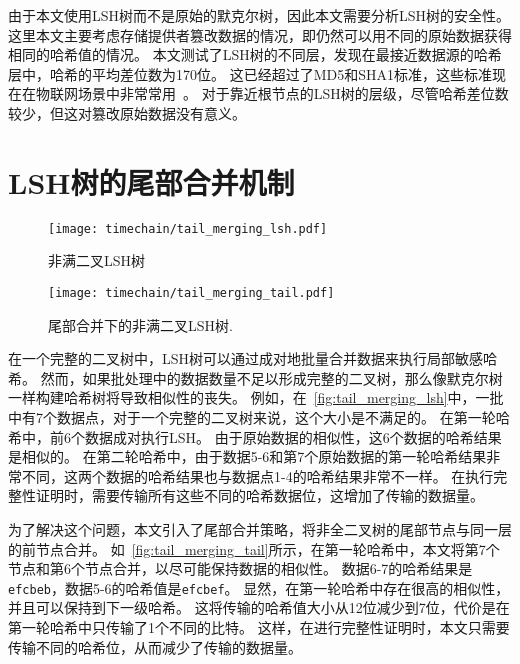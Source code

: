 由于本文使用LSH树而不是原始的默克尔树，因此本文需要分析LSH树的安全性。
这里本文主要考虑存储提供者篡改数据的情况，即仍然可以用不同的原始数据获得相同的哈希值的情况。
本文测试了LSH树的不同层，发现在最接近数据源的哈希层中，哈希的平均差位数为170位。
这已经超过了MD5和SHA1标准，这些标准现在在物联网场景中非常常用~\cite{chi2017hashing,landge2018secured}。
对于靠近根节点的LSH树的层级，尽管哈希差位数较少，但这对篡改原始数据没有意义。

\section{LSH树的尾部合并机制}

\begin{figure}[t]
    \centering
	\begin{minipage}{0.6\linewidth}
        \centering
        \texttt{[image: timechain/tail\_merging\_lsh.pdf]}
        \caption{非满二叉LSH树}
        \label{fig:tail_merging_lsh}
	\end{minipage}
\end{figure}

\begin{figure}[t]
    \centering
	\begin{minipage}{0.6\linewidth}
        \centering
        \texttt{[image: timechain/tail\_merging\_tail.pdf]}
	\end{minipage}
	\caption{尾部合并下的非满二叉LSH树.}
	\label{fig:tail_merging_tail}
\end{figure}

在一个完整的二叉树中，LSH树可以通过成对地批量合并数据来执行局部敏感哈希。
然而，如果批处理中的数据数量不足以形成完整的二叉树，那么像默克尔树一样构建哈希树将导致相似性的丧失。
例如，在~\autoref{fig:tail_merging_lsh}中，一批中有7个数据点，对于一个完整的二叉树来说，这个大小是不满足的。
在第一轮哈希中，前6个数据成对执行LSH。
由于原始数据的相似性，这6个数据的哈希结果是相似的。
在第二轮哈希中，由于数据5-6和第7个原始数据的第一轮哈希结果非常不同，这两个数据的哈希结果也与数据点1-4的哈希结果非常不一样。
在执行完整性证明时，需要传输所有这些不同的哈希数据位，这增加了传输的数据量。

为了解决这个问题，本文引入了尾部合并策略，将非全二叉树的尾部节点与同一层的前节点合并。
如~\autoref{fig:tail_merging_tail}所示，在第一轮哈希中，本文将第7个节点和第6个节点合并，以尽可能保持数据的相似性。
数据6-7的哈希结果是\texttt{efcbeb}，数据5-6的哈希值是\texttt{efcbef}。
显然，在第一轮哈希中存在很高的相似性，并且可以保持到下一级哈希。
这将传输的哈希值大小从12位减少到7位，代价是在第一轮哈希中只传输了1个不同的比特。
这样，在进行完整性证明时，本文只需要传输不同的哈希位，从而减少了传输的数据量。

